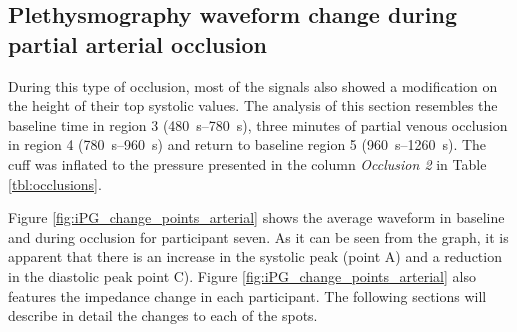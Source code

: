 \subsection{Plethysmography waveform change during partial arterial occlusion}
\label{section results 3.2}
During this type of occlusion, most of the signals also showed a modification on the height of their top systolic values. The analysis of this section resembles the baseline time in region 3 (\SIrange{480}{780}{\second}), three minutes of partial venous occlusion in region 4 (\SIrange{780}{960}{\second}) and return to baseline region 5 (\SIrange{960}{1260}{\second}). The cuff was inflated to the pressure presented in the column \textit{Occlusion 2} in Table \ref{tbl:occlusions}. 

Figure \ref{fig:iPG_change_points_arterial} shows the average waveform in baseline and during occlusion for participant seven. As it can be seen from the graph, it is apparent that there is an increase in the systolic peak (point A) and a reduction in the diastolic peak point C). Figure \ref{fig:iPG_change_points_arterial} also features the impedance change in each participant. The following sections will describe in detail the changes to each of the spots. 

